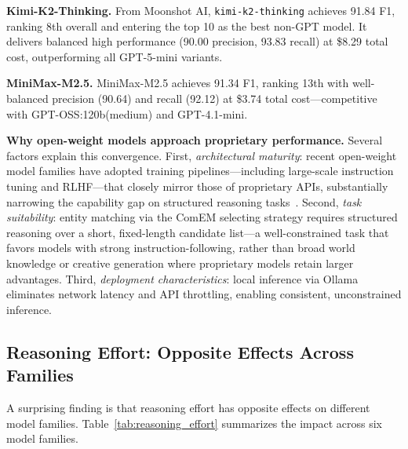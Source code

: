 \documentclass[runningheads]{llncs}
\begin{document}
\textbf{Kimi-K2-Thinking.} From Moonshot AI, \texttt{kimi-k2-thinking} achieves 91.84 F1, ranking 8th overall and entering the top 10 as the best non-GPT model. It delivers balanced high performance (90.00 precision, 93.83 recall) at \$8.29 total cost, outperforming all GPT-5-mini variants.

\textbf{MiniMax-M2.5.} MiniMax-M2.5 achieves 91.34 F1, ranking 13th with well-balanced precision (90.64) and recall (92.12) at \$3.74 total cost---competitive with GPT-OSS:120b(medium) and GPT-4.1-mini.

\textbf{Why open-weight models approach proprietary performance.} Several factors explain this convergence. First, \emph{architectural maturity}: recent open-weight model families have adopted training pipelines---including large-scale instruction tuning and RLHF---that closely mirror those of proprietary APIs, substantially narrowing the capability gap on structured reasoning tasks~\cite{dubey2024llama,qwen2025technical}. Second, \emph{task suitability}: entity matching via the ComEM selecting strategy requires structured reasoning over a short, fixed-length candidate list---a well-constrained task that favors models with strong instruction-following, rather than broad world knowledge or creative generation where proprietary models retain larger advantages. Third, \emph{deployment characteristics}: local inference via Ollama eliminates network latency and API throttling, enabling consistent, unconstrained inference.

\subsection{Reasoning Effort: Opposite Effects Across Families}

A surprising finding is that reasoning effort has opposite effects on different model families. Table~\ref{tab:reasoning_effort} summarizes the impact across six model families.
\end{document}
